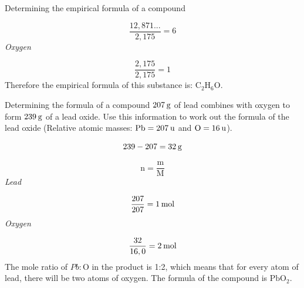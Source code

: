 \begin{wex}{Determining the empirical formula of a compound }
{      \label{m38712*id281223}\nopagebreak\noindent{}
        
    \begin{equation*}
    \frac{12,871...}{2,175}=6
      \end{equation*}
      \label{m38712*id281254}
        \textsl{Oxygen}
      
      \label{m38712*id281261}\nopagebreak\noindent{}
        
    \begin{equation*}
    \frac{2,175}{2,175}=1
      \end{equation*}
      \label{m38712*id281292}Therefore the empirical formula of this substance is: ${\text{C}}_{2}{\text{H}}_{6}\text{O}$.
}
    \end{wex}
    \noindent
\label{m38712*secfhsst!!!underscore!!!id1235}\vspace{-3cm} 
      \noindent
      \begin{wex}{Determining the formula of a compound }{
      \label{m38712*probfhsst!!!underscore!!!id1236}
      \label{m38712*id281333}$207\phantom{\rule{2pt}{0ex}}\text{g}$ of lead combines with oxygen to form $239\phantom{\rule{2pt}{0ex}}\text{g}$ of a lead oxide. Use this information to work out the formula of the lead oxide (Relative atomic masses: $\text{Pb}=207\phantom{\rule{2pt}{0ex}}\text{u}$ and $\text{O}=16\phantom{\rule{2pt}{0ex}}\text{u}$).
}
{
      \label{m38712*id281379}\nopagebreak\noindent{}
    \begin{equation*}
    239-207=32\phantom{\rule{2pt}{0ex}}\text{g}
      \end{equation*}
      \label{m38712*id281407}\nopagebreak\noindent{}
        
    \begin{equation*}
    \text{n}=\frac{\text{m}}{\text{M}}
      \end{equation*}
      \label{m38712*id281427}
        \textsl{Lead}
       
      \label{m38712*id281433}\nopagebreak\noindent{}
        
    \begin{equation*}
    \frac{207}{207}=1\phantom{\rule{2pt}{0ex}}\text{mol}
      \end{equation*}
      \label{m38712*id281460}
        \textsl{Oxygen}
    
      \label{m38712*id281467}\nopagebreak\noindent{}
        
    \begin{equation*}
    \frac{32}{16,0}=2\phantom{\rule{2pt}{0ex}}\text{mol}
      \end{equation*}
      \label{m38712*id281498}The mole ratio of $Pb:\text{O}$ in the product is 1:2, which means that for every atom of lead, there will be two atoms of oxygen. The formula of the compound is $\text{PbO}{}_{2}$. 
}
    \end{wex}
